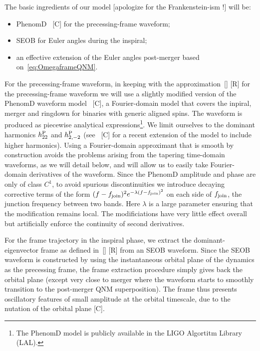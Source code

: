 \documentclass[aps,showpacs,twocolumn,
prd,superscriptaddress,nofootinbib]{revtex4-1}
\newcommand{\SM}[1]{{\color{Red} #1}}
\begin{document}
The basic ingredients of our model \SM{[apologize for the Frankenstein-ism !]} will be:
\begin{itemize}
	\item PhenomD~\cite{} \SM{[C]} for the precessing-frame waveform;
	\item SEOB for Euler angles during the inspiral;
	\item an effective extension of the Euler angles post-merger based on~\eqref{eq:OmegaframeQNM}.
\end{itemize}
For the precessing-frame waveform, in keeping with the approximation~\eqref{} \SM{[R]} for the precessing-frame waveform we will use a slightly modified version of the PhenomD waveform model~\cite{} \SM{[C]}, a Fourier-domain model that covers the inpiral, merger and ringdown for binaries with generic aligned spins. The waveform is produced as piecewise analytical expressions\footnote{The PhenomD model is publicly available in the LIGO Algortitm Library (LAL).}. We limit ourselves to the dominant harmonics $h^{\rm P}_{22}$ and $h^{\rm P}_{2,-2}$ (see~\cite{} \SM{[C]} for a recent extension of the model to include higher harmonics). Using a Fourier-domain approximant that is smooth by construction avoids the problems arising from the tapering time-domain waveforms, as we will detail below, and will allow us to easily take Fourier-domain derivatives of the waveform. Since the PhenomD amplitude and phase are only of class $C^{1}$, to avoid spurious discontinuities we introduce decaying corrective terms of the form $(f-f_{\rm join})^{2} e^{-\lambda(f-f_{\rm join})^{2}}$ on each side of $f_{\rm join}$, the junction frequency between two bands. Here $\lambda$ is a large parameter ensuring that the modification remains local. The modificiations have very little effect overall but artificially enforce the continuity of second derivatives.

For the frame trajectory in the inspiral phase, we extract the dominant-eigenvector frame as defined in~\eqref{} \SM{[R]} from an SEOB waveform. Since the SEOB waveform is constructed by using the instantaneous orbital plane of the dynamics as the precessing frame, the frame extraction procedure simply gives back the orbital plane (except very close to merger where the waveform starts to smoothly transition to the post-merger QNM superposition). The frame thus presents oscillatory features of small amplitude at the orbital timescale, due to the nutation of the orbital plane \cite{} \SM{[C]}.
\end{document}
